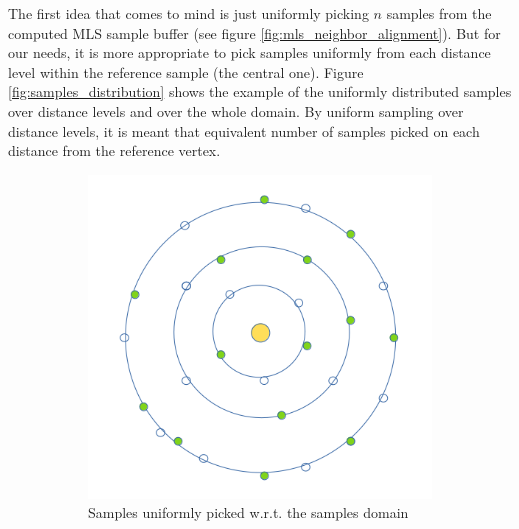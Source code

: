The first idea that comes to mind is just uniformly picking $n$ samples from the computed MLS sample buffer (see figure \ref{fig:mls_neighbor_alignment}). But for our needs, it is more appropriate to pick samples uniformly from each distance level within the reference sample (the central one). Figure \ref{fig:samples_distribution} shows the example of the uniformly distributed samples over distance levels and over the whole domain. By uniform sampling over distance levels, it is meant that equivalent number of samples picked on each distance from the reference vertex.
\begin{figure}
	\begin{center}
		\begin{subfigure}[b]{0.48\textwidth}
			\includegraphics[width=\textwidth]{figures/SampleDistrUnifOverDomain.png}
			\caption{Samples uniformly picked w.r.t. the samples domain}
		\end{subfigure}
		\begin{subfigure}[b]{0.48\textwidth}

\end{subfigure}
\end{center}
\end{figure}
